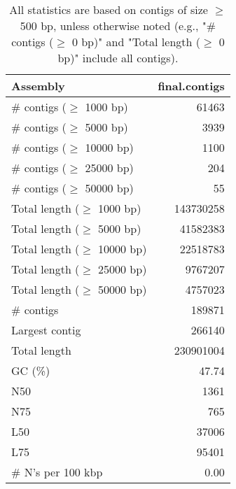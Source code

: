 \documentclass[12pt,a4paper]{article}
\begin{document}
\begin{table}[ht]
\begin{center}
\caption{All statistics are based on contigs of size $\geq$ 500 bp, unless otherwise noted (e.g., "\# contigs ($\geq$ 0 bp)" and "Total length ($\geq$ 0 bp)" include all contigs).}
\begin{tabular}{|l*{1}{|r}|}
\hline
Assembly & final.contigs \\ \hline
\# contigs ($\geq$ 1000 bp) & 61463 \\ \hline
\# contigs ($\geq$ 5000 bp) & 3939 \\ \hline
\# contigs ($\geq$ 10000 bp) & 1100 \\ \hline
\# contigs ($\geq$ 25000 bp) & 204 \\ \hline
\# contigs ($\geq$ 50000 bp) & 55 \\ \hline
Total length ($\geq$ 1000 bp) & 143730258 \\ \hline
Total length ($\geq$ 5000 bp) & 41582383 \\ \hline
Total length ($\geq$ 10000 bp) & 22518783 \\ \hline
Total length ($\geq$ 25000 bp) & 9767207 \\ \hline
Total length ($\geq$ 50000 bp) & 4757023 \\ \hline
\# contigs & 189871 \\ \hline
Largest contig & 266140 \\ \hline
Total length & 230901004 \\ \hline
GC (\%) & 47.74 \\ \hline
N50 & 1361 \\ \hline
N75 & 765 \\ \hline
L50 & 37006 \\ \hline
L75 & 95401 \\ \hline
\# N's per 100 kbp & 0.00 \\ \hline
\end{tabular}
\end{center}
\end{table}
\end{document}
